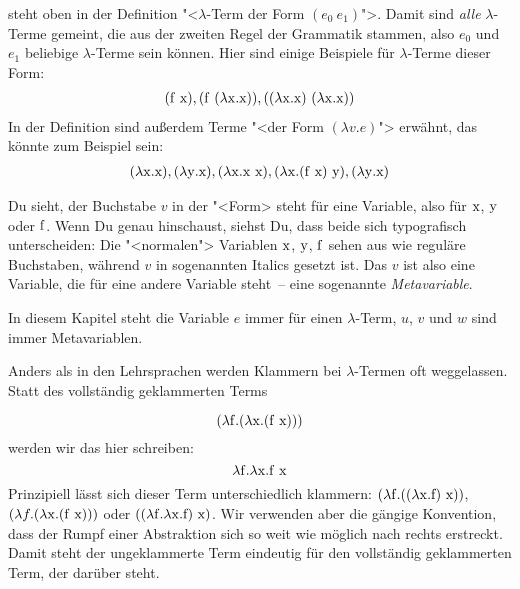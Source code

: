 steht oben in der Definition "<$\lambda$-Term der Form
$(e_0~e_1)$">. Damit sind \emph{alle} $\lambda$-Terme gemeint, die aus der
zweiten Regel der Grammatik stammen, also $e_0$ und $e_1$ beliebige
$\lambda$-Terme sein können.  Hier sind einige Beispiele für
$\lambda$-Terme dieser Form:
%
\begin{displaymath}
  \begin{array}{c}
    (\mathrm f~\mathrm x),
    (\mathrm f~(\lambda \mathrm x.\mathrm x)),
    ((\lambda \mathrm x.\mathrm x)~(\lambda \mathrm x.\mathrm x))
  \end{array}
\end{displaymath}
%
In der Definition sind außerdem Terme "<der Form $(\lambda v.e)$">
erwähnt, das könnte zum Beispiel sein:
%
\begin{displaymath}
  \begin{array}{c}
    (\lambda \mathrm x.\mathrm x),
    (\lambda \mathrm y.\mathrm x),
    (\lambda \mathrm x.\mathrm x~\mathrm x),
    (\lambda \mathrm x.(\mathrm f~\mathrm x)~\mathrm y),
    (\lambda \mathrm y.\mathrm x)
  \end{array}
\end{displaymath}
%

Du sieht, der Buchstabe $v$ in der "<Form> steht für eine Variable,
also für $\mathrm x$, $\mathrm y$ oder $\mathrm f$.  Wenn Du genau hinschaust,
siehst Du, dass beide sich typografisch unterscheiden: Die
"<normalen"> Variablen $\mathrm x$, $\mathrm y$, $\mathrm f$ sehen aus wie
reguläre Buchstaben, während $v$ in sogenannten Italics gesetzt ist.
Das $v$ ist also eine Variable, die für eine andere Variable steht~--
eine sogenannte \textit{Metavariable}.

In diesem Kapitel steht die Variable $e$ immer für einen
$\lambda$-Term, $u$, $v$ und $w$ sind immer Metavariablen.

Anders als in den Lehrsprachen werden Klammern bei $\lambda$-Termen
oft weggelassen.  Statt des vollständig geklammerten Terms

\begin{displaymath}
  (\lambda \mathrm f.(\lambda \mathrm x.(\mathrm f~\mathrm x)))
\end{displaymath}
%
werden wir das hier schreiben: 
%
\begin{displaymath}
  \lambda \mathrm f.\lambda \mathrm x.\mathrm f~\mathrm x
\end{displaymath}
%
Prinzipiell lässt sich dieser Term unterschiedlich
klammern: $(\lambda \mathrm f.((\lambda \mathrm x.\mathrm f)~\mathrm x))$, $(\lambda
f.(\lambda \mathrm x.(\mathrm f~\mathrm x)))$ oder $((\lambda \mathrm f.\lambda
\mathrm x.\mathrm f)~\mathrm x)$.  Wir verwenden aber die gängige Konvention,
dass der Rumpf einer Abstraktion sich so weit wie möglich nach
rechts erstreckt.   Damit steht der ungeklammerte Term eindeutig für
den vollständig geklammerten Term, der darüber steht.

